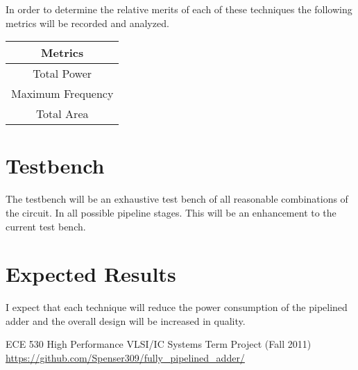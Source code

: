 \documentclass[10pt,letterpaper]{article}
\begin{document}
In order to determine the relative merits of each of these techniques the following metrics will be recorded and analyzed.

\begin{center}
\begin{tabular}{|c|}
\hline Metrics \\
\hline 
\hline Total Power \\
\hline Maximum Frequency \\
\hline Total Area \\
\hline 
\end{tabular}
\end{center}


\section{Testbench}

The testbench will be an exhaustive test bench of all reasonable combinations of the circuit.  In all possible pipeline stages.  This will be an enhancement to the current test bench.

\section{Expected Results}

I expect that each technique will reduce the power consumption of the pipelined adder and the overall design will be increased in quality.

\begin{thebibliography}{9}

 ECE 530 High Performance VLSI/IC Systems Term Project (Fall 2011)
 \url{https://github.com/Spenser309/fully_pipelined_adder/}

\end{thebibliography}
\end{document}
